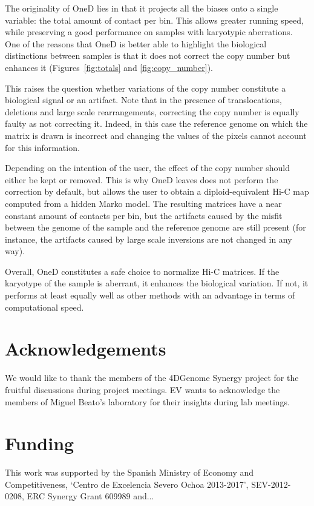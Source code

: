 \documentclass{bioinfo}
\begin{document}
The originality of OneD lies in that it projects all the biases onto a
single variable: the total amount of contact per bin. This allows greater
running speed, while preserving a good performance on samples with
karyotypic aberrations. One of the reasons that OneD is better able to
highlight the biological distinctions between samples is that it does not
correct the copy number but enhances it (Figures~\ref{fig:totals} and
\ref{fig:copy_number}).

This raises the question whether variations of the copy number constitute
a biological signal or an artifact. Note that in the presence of
translocations, deletions and large scale rearrangements, correcting the
copy number is equally faulty as not correcting it. Indeed, in this case
the reference genome on which the matrix is drawn is incorrect and
changing the values of the pixels cannot account for this information.

Depending on the intention of the user, the effect of the copy number
should either be kept or removed. This is why OneD leaves does not perform
the correction by default, but allows the user to obtain a
diploid-equivalent Hi-C map computed from a hidden Marko model. The
resulting matrices have a near constant amount of contacts per bin, but
the artifacts caused by the misfit between the genome of the sample and
the reference genome are still present (for instance, the artifacts caused
by large scale inversions are not changed in any way).

Overall, OneD constitutes a safe choice to normalize Hi-C matrices. If the
karyotype of the sample is aberrant, it enhances the biological variation.
If not, it performs at least equally well as other methods with an
advantage in terms of computational speed.



\section*{Acknowledgements}

We would like to thank the members of the 4DGenome Synergy project for the
fruitful discussions during project meetings. EV wants to acknowledge
the members of Miguel Beato's laboratory for their insights during lab
meetings.

\section*{Funding}

This work was supported by the Spanish Ministry of Economy and
Competitiveness, ‘Centro de Excelencia Severo Ochoa 2013-2017’,
SEV-2012-0208, ERC Synergy Grant 609989 and...

\vspace*{-12pt}



\end{document}
